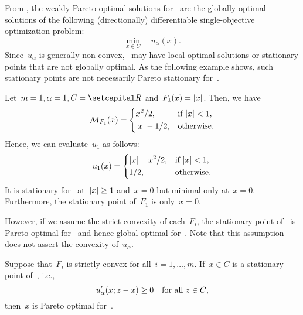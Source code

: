 \documentclass[../../main]{subfiles}
\begin{document}
From , the weakly Pareto optimal solutions for~ are the globally optimal solutions of the following (directionally) differentiable single-objective optimization problem:
\begin{equation} \label{eq:min_reg_gap}
    \min_{x \in C} \quad u_\alpha(x)
    .\end{equation}
Since~$u_\alpha$ is generally non-convex,~ may have local optimal solutions or stationary points that are not globally optimal.
As the following example shows, such stationary points are not necessarily Pareto stationary for~.
\begin{example} 
    Let~$m = 1, \alpha = 1, C = \setR$ and~$F_1(x) = \lvert x\rvert$.
    Then, we have
    \begin{equation}
        \operatorname{\mathcal{M}}_{F_1}(x) = \begin{dcases}
            x^2 / 2,         & \text{if } \lvert x\rvert < 1, \\
            \lvert x\rvert - 1 / 2, & \text{otherwise}
            .\end{dcases}
    \end{equation}
    Hence, we can evaluate~$u_1$ as follows:
    \begin{equation}
        u_1(x) = \begin{dcases}
            \lvert x\rvert - x^2 / 2, & \text{if } \lvert x\rvert < 1, \\
            1 / 2,             & \text{otherwise}
            .\end{dcases}
    \end{equation}
    It is stationary for~ at~$\lvert x\rvert \ge 1$ and~$x = 0$ but minimal only at~$x = 0$.
    Furthermore, the stationary point of~$F_1$ is only~$x = 0$.
\end{example}
However, if we assume the strict convexity of each~$F_i$, the stationary point of~ is Pareto optimal for~ and hence global optimal for~.
Note that this assumption does not assert the convexity of~$u_\alpha$.
\begin{theorem} 
    Suppose that~$F_i$ is strictly convex for all~$i = 1, \dots, m$.
    If~$x \in C$ is a stationary point of~, i.e.,
    \begin{equation}
        u_\alpha'(x; z - x) \ge 0 \quad \text{for all~$z \in C$}
        ,\end{equation}
    then~$x$ is Pareto optimal for~.
\end{theorem}
\end{document}
